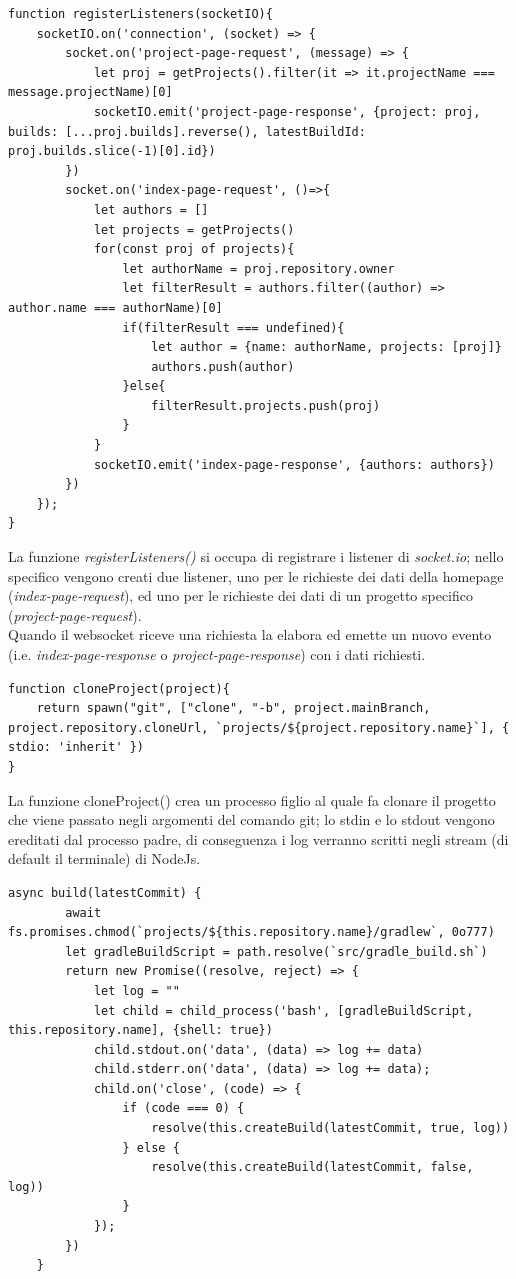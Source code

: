 \documentclass{report}
\begin{document}
\begin{lstlisting}
function registerListeners(socketIO){
    socketIO.on('connection', (socket) => {
        socket.on('project-page-request', (message) => {
            let proj = getProjects().filter(it => it.projectName === message.projectName)[0]
            socketIO.emit('project-page-response', {project: proj, builds: [...proj.builds].reverse(), latestBuildId: proj.builds.slice(-1)[0].id})
        })
        socket.on('index-page-request', ()=>{
            let authors = []
            let projects = getProjects()
            for(const proj of projects){
                let authorName = proj.repository.owner
                let filterResult = authors.filter((author) => author.name === authorName)[0]
                if(filterResult === undefined){
                    let author = {name: authorName, projects: [proj]}
                    authors.push(author)
                }else{
                    filterResult.projects.push(proj)
                }
            }
            socketIO.emit('index-page-response', {authors: authors})
        })
    });
}
\end{lstlisting}
La funzione \textit{registerListeners()} si occupa di registrare i listener di \textit{socket.io}; nello specifico vengono creati due listener, uno per le richieste dei dati della homepage (\textit{index-page-request}), ed uno per le richieste dei dati di un progetto specifico (\textit{project-page-request}).\\
Quando il websocket riceve una richiesta la elabora ed emette un nuovo evento (i.e. \textit{index-page-response} o \textit{project-page-response}) con i dati richiesti.
\begin{lstlisting}
function cloneProject(project){
    return spawn("git", ["clone", "-b", project.mainBranch, project.repository.cloneUrl, `projects/${project.repository.name}`], { stdio: 'inherit' })
}
\end{lstlisting}
La funzione cloneProject() crea un processo figlio al quale fa clonare il progetto che viene passato negli argomenti del comando git; lo stdin e lo stdout vengono ereditati dal processo padre, di conseguenza i log verranno scritti negli stream (di default il terminale) di NodeJs.
\begin{lstlisting}
async build(latestCommit) {
        await fs.promises.chmod(`projects/${this.repository.name}/gradlew`, 0o777)
        let gradleBuildScript = path.resolve(`src/gradle_build.sh`)
        return new Promise((resolve, reject) => {
            let log = ""
            let child = child_process('bash', [gradleBuildScript, this.repository.name], {shell: true})
            child.stdout.on('data', (data) => log += data)
            child.stderr.on('data', (data) => log += data);
            child.on('close', (code) => {
                if (code === 0) {
                    resolve(this.createBuild(latestCommit, true, log))
                } else {
                    resolve(this.createBuild(latestCommit, false, log))
                }
            });
        })
    }
\end{lstlisting}
\end{document}

